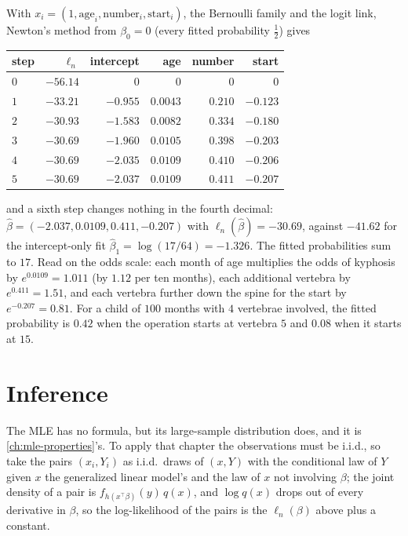 \begin{worked}
With $x_i = (1, \text{age}_i, \text{number}_i, \text{start}_i)$, the Bernoulli family and the logit link, Newton's method from $\beta_0 = 0$ (every fitted probability $\frac12$) gives
\begin{center}
\small
\begin{tabular}{@{}lrrrrr@{}}
\toprule
step & $\ell_n$ & intercept & age & number & start \\
\midrule
$0$ & $-56.14$ & $0$ & $0$ & $0$ & $0$ \\
$1$ & $-33.21$ & $-0.955$ & $0.0043$ & $0.210$ & $-0.123$ \\
$2$ & $-30.93$ & $-1.583$ & $0.0082$ & $0.334$ & $-0.180$ \\
$3$ & $-30.69$ & $-1.960$ & $0.0105$ & $0.398$ & $-0.203$ \\
$4$ & $-30.69$ & $-2.035$ & $0.0109$ & $0.410$ & $-0.206$ \\
$5$ & $-30.69$ & $-2.037$ & $0.0109$ & $0.411$ & $-0.207$ \\
\bottomrule
\end{tabular}
\end{center}
and a sixth step changes nothing in the fourth decimal: $\hat{\beta} = (-2.037, 0.0109, 0.411, -0.207)$ with $\ell_n(\hat{\beta}) = -30.69$, against $-41.62$ for the intercept-only fit $\hat{\beta}_1 = \log(17/64) = -1.326$. The fitted probabilities sum to $17$. Read on the odds scale: each month of age multiplies the odds of kyphosis by $e^{0.0109} = 1.011$ (by $1.12$ per ten months), each additional vertebra by $e^{0.411} = 1.51$, and each vertebra further down the spine for the start by $e^{-0.207} = 0.81$. For a child of $100$ months with $4$ vertebrae involved, the fitted probability is $0.42$ when the operation starts at vertebra $5$ and $0.08$ when it starts at $15$.
\end{worked}

\section{Inference}
\label{sec:glm-inference}

The MLE has no formula, but its large-sample distribution does, and it is \cref{ch:mle-properties}'s.
To apply that chapter the observations must be i.i.d., so take the pairs $(x_i, Y_i)$ as i.i.d.\ draws of $(x, Y)$ with the conditional law of $Y$ given $x$ the generalized linear model's and the law of $x$ not involving $\beta$; the joint density of a pair is $f_{h(x^\top\beta)}(y)\,q(x)$, and $\log q(x)$ drops out of every derivative in $\beta$, so the log-likelihood of the pairs is the $\ell_n(\beta)$ above plus a constant.

